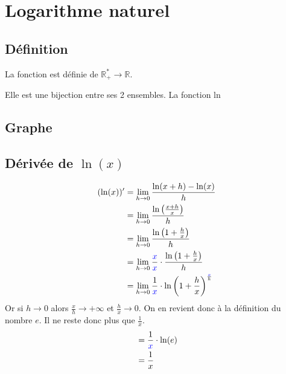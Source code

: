\documentclass[12pt,a4paper]{report}
\begin{document}
	
	\chapter[Analyse]{Logarithme naturel}
	\section*{Définition}
	La fonction est définie de $\mathbb{R}^*_{+} \rightarrow \mathbb{R}$.
	
	Elle est une bijection entre ses 2 ensembles.
	La fonction ln
	\section*{Graphe}
	\section*{Dérivée de $\ln(x)$}
	\begin{align*}
	(\ln(x))' &= \lim\limits_{h \rightarrow 0} \dfrac{\ln(x+h) - \ln(x)}{h} \\
	&= \lim\limits_{h \rightarrow 0} \dfrac{\ln\left(\frac{x+h}{x}\right)}{h} \\
	&= \lim\limits_{h \rightarrow 0} \dfrac{\ln\left(1+\frac{h}{x}\right)}{h} \\
	&= \lim\limits_{h \rightarrow 0} \frac{\color{blue}x}{\color{blue}x} \cdot \dfrac{\ln\left(1+\frac{h}{x}\right)}{h} \\
	&= \lim\limits_{h \rightarrow 0} \frac{1}{\color{blue}x} \cdot \ln\left(1+\frac{h}{x}\right)^{\frac{\color{blue}x}{h}}
	\end{align*}
	Or si $h \rightarrow 0$ alors $ \frac{x}{h} \rightarrow +\infty$ et $ \frac{h}{x} \rightarrow 0$. On en revient donc à la définition du nombre $e$. Il ne reste donc plus que $\frac{1}{x}$.
	\begin{align*}
	&= \dfrac{1}{\color{blue}x}\cdot\ln(e) \\
	&= \dfrac{1}{x}
	\end{align*}
\end{document}
